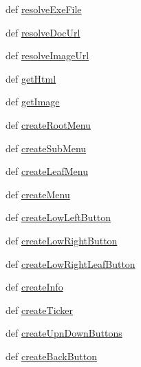 \begin{DoxyCompactItemize}
\item 
def \hyperlink{classmenumanager_1_1MenuManager_a245c6a72372d2fc0f5cd569012ec79db}{resolve\+Exe\+File}
\item 
def \hyperlink{classmenumanager_1_1MenuManager_a9a3cc0d06ce347e00730c49f758be4b5}{resolve\+Doc\+Url}
\item 
def \hyperlink{classmenumanager_1_1MenuManager_aa9c4466de789112fac327b7cca36b7df}{resolve\+Image\+Url}
\item 
def \hyperlink{classmenumanager_1_1MenuManager_a77f7645c0e74c41c3aeb2584ad2072ee}{get\+Html}
\item 
def \hyperlink{classmenumanager_1_1MenuManager_a7088b1647710903ef411f564e97bc809}{get\+Image}
\item 
def \hyperlink{classmenumanager_1_1MenuManager_abfef4cd5fee61b5dacd37dfaed538cc9}{create\+Root\+Menu}
\item 
def \hyperlink{classmenumanager_1_1MenuManager_a484b6474f3d52f42041da975dd9969e2}{create\+Sub\+Menu}
\item 
def \hyperlink{classmenumanager_1_1MenuManager_a733078794172d7a4caed81e31a01da03}{create\+Leaf\+Menu}
\item 
def \hyperlink{classmenumanager_1_1MenuManager_ac7345d9afb08fde062e49c0eea6fed8d}{create\+Menu}
\item 
def \hyperlink{classmenumanager_1_1MenuManager_a2854979f6e1d9c326f69d6f26d888a4f}{create\+Low\+Left\+Button}
\item 
def \hyperlink{classmenumanager_1_1MenuManager_a351e7a40457a7a1d8ffae0ba956b9f30}{create\+Low\+Right\+Button}
\item 
def \hyperlink{classmenumanager_1_1MenuManager_a90bb890392772384c5d74afe42d433c4}{create\+Low\+Right\+Leaf\+Button}
\item 
def \hyperlink{classmenumanager_1_1MenuManager_a282b268694c4e89b52acb466b56ebd98}{create\+Info}
\item 
def \hyperlink{classmenumanager_1_1MenuManager_ae781550993849413a7df0462a8125895}{create\+Ticker}
\item 
def \hyperlink{classmenumanager_1_1MenuManager_a3edf1e3d80da5cc037da1a8763bb33fe}{create\+Upn\+Down\+Buttons}
\item 
def \hyperlink{classmenumanager_1_1MenuManager_a09e58e392fa2fc0054aa3ba8e4113e33}{create\+Back\+Button}
\end{DoxyCompactItemize}
